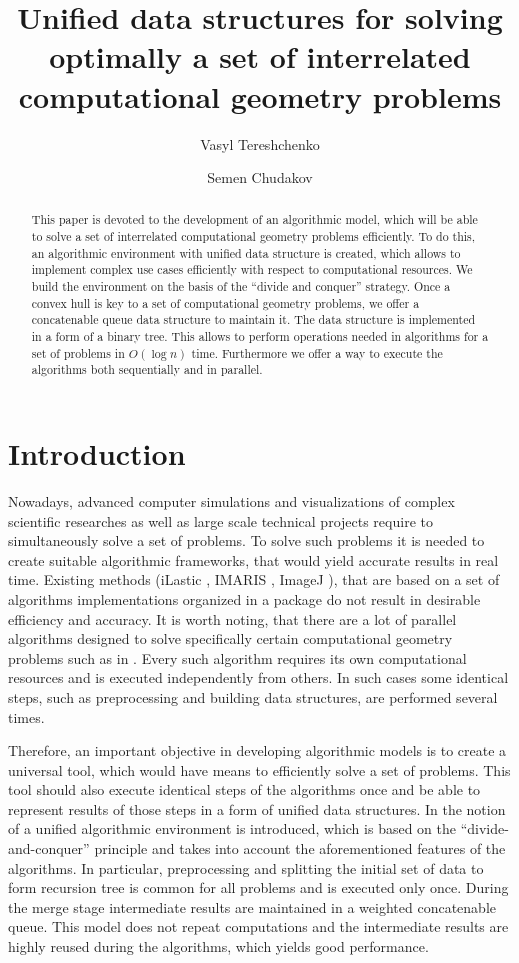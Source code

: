 \documentclass[a4paper,english,numberwithinsect,notab]{eurocg20-submission}
\title{Unified data structures for solving optimally a set of interrelated computational geometry problems}
\author[1]{Vasyl Tereshchenko}
\author[2]{Semen Chudakov}
\affil[1]{
	Faculty of computer science and cybernetics, Taras Shevchenko National University of Kyiv, Ukraine\\
  \texttt{vtereshch@gmail.com}}
\affil[2]{Faculty of computer science and cybernetics, Taras Shevchenko National University of Kyiv, Ukraine\\
  \texttt{semen.chudakov7@gmail.com}}
\begin{document}
\maketitle

\begin{abstract}
	This paper is devoted to the development of an algorithmic model, which will be able to solve a set of interrelated computational geometry problems efficiently. To do this, an algorithmic environment with unified data structure is created, which allows to implement complex use cases efficiently with respect to computational resources. We build the environment on the basis of the ``divide and conquer'' strategy.
 	Once a convex hull is key to a set of computational geometry problems, we offer a concatenable queue data structure to maintain it. The data structure is implemented in a form of a binary tree. This allows to perform operations needed in algorithms for a set of problems in $O(\log n)$ time. Furthermore we offer a way to execute the algorithms both sequentially and in parallel.
\end{abstract}

\section{Introduction}
\label{sec:introduction}

	Nowadays, advanced computer simulations and visualizations of complex scientific researches as well as large scale technical projects require to simultaneously solve a set of problems. To solve such problems it is needed to create suitable algorithmic frameworks, that would yield accurate results in real time. Existing methods (iLastic \cite{ilastik}, IMARIS \cite{imaris}, ImageJ \cite{imagej}), that are based on a set of algorithms implementations organized in a package do not result in desirable efficiency and accuracy. It is worth noting, that there are a lot of parallel algorithms designed to solve specifically certain computational geometry problems such as in \cite{aggarwal,atallah,cole,amato,chen,berkman,goodman,akl,jaja,leeuwen,reif}. Every such algorithm requires its own computational resources and is executed independently from others. In such cases some identical steps, such as preprocessing and building data structures, are performed several times. 
	
	Therefore, an important objective in developing algorithmic models is to create a universal tool, which would have means to efficiently solve a set of problems. This tool should also execute identical steps of the algorithms once and be able to represent results of those steps in a form of unified data structures. In \cite{tereshchenko} the notion of a unified algorithmic environment is introduced, which is based on the ``divide-and-conquer'' principle and takes into account the aforementioned features of the algorithms. In particular, preprocessing and splitting the initial set of data to form recursion tree is common for all problems and is executed only once. During the merge stage intermediate results are maintained in a weighted concatenable queue. This model does not repeat computations and the intermediate results are highly reused during the algorithms, which yields good performance.
	
\end{document}
